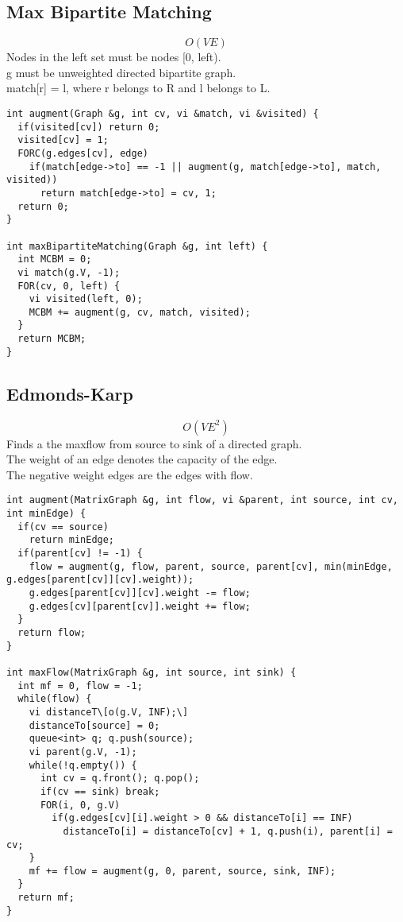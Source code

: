 \documentclass[11pt, oneside]{article}
\begin{document}
\subsection{Max Bipartite Matching}
\[O(VE)\]
Nodes in the left set must be nodes [0, left).\\
g must be unweighted directed bipartite graph.\\
match[r] = l, where r belongs to R and l belongs to L.\\
\begin{lstlisting}
int augment(Graph &g, int cv, vi &match, vi &visited) {
  if(visited[cv]) return 0;
  visited[cv] = 1;
  FORC(g.edges[cv], edge)
    if(match[edge->to] == -1 || augment(g, match[edge->to], match, visited))
      return match[edge->to] = cv, 1;
  return 0;
}

int maxBipartiteMatching(Graph &g, int left) {
  int MCBM = 0;
  vi match(g.V, -1);
  FOR(cv, 0, left) {
    vi visited(left, 0);
    MCBM += augment(g, cv, match, visited);
  }
  return MCBM;
}
\end{lstlisting}

\subsection{Edmonds-Karp}
\[O(VE^2)\]
Finds a the maxflow from source to sink of a directed graph.\\
The weight of an edge denotes the capacity of the edge.\\
The negative weight edges are the edges with flow.\\
\begin{lstlisting}
int augment(MatrixGraph &g, int flow, vi &parent, int source, int cv, int minEdge) {
  if(cv == source)
    return minEdge;
  if(parent[cv] != -1) {
    flow = augment(g, flow, parent, source, parent[cv], min(minEdge, g.edges[parent[cv]][cv].weight));
    g.edges[parent[cv]][cv].weight -= flow;
    g.edges[cv][parent[cv]].weight += flow;
  }
  return flow;
}

int maxFlow(MatrixGraph &g, int source, int sink) {
  int mf = 0, flow = -1;
  while(flow) {
    vi distanceT\[o(g.V, INF);\]
    distanceTo[source] = 0;
    queue<int> q; q.push(source);
    vi parent(g.V, -1);
    while(!q.empty()) {
      int cv = q.front(); q.pop();
      if(cv == sink) break;
      FOR(i, 0, g.V)
        if(g.edges[cv][i].weight > 0 && distanceTo[i] == INF)
          distanceTo[i] = distanceTo[cv] + 1, q.push(i), parent[i] = cv;
    }
    mf += flow = augment(g, 0, parent, source, sink, INF);
  }
  return mf;
}
\end{lstlisting}
\end{document}
